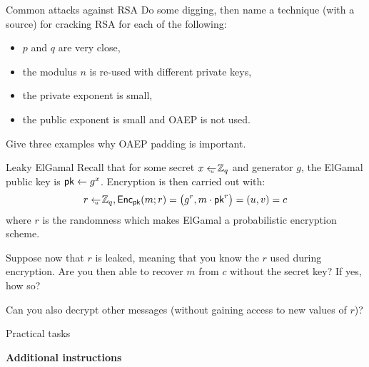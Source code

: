 \documentclass{homework}
\begin{document}
\begin{task}{Common attacks against RSA}
  Do some digging, then name a technique (with a source) for cracking RSA for each of the following:
  \begin{itemize}
    \item $p$ and $q$ are very close,
    \item the modulus $n$ is re-used with different private keys,
    \item the private exponent is small,
    \item the public exponent is small and OAEP is not used.
  \end{itemize}

  Give three examples why OAEP padding is important.
\end{task}

\begin{task}{Leaky ElGamal}
  Recall that for some secret $x\gets_{\scriptscriptstyle \hspace*{-0.65em} u\hspace*{0.0em}}\mathbb{Z}_q$ and generator $g$, the ElGamal public key is $\mathsf{pk}\gets g^x$.
  Encryption is then carried out with:
  \[
    r \gets_{\scriptscriptstyle \hspace*{-0.65em} u\hspace*{0.0em}} \mathbb{Z}_q, \mathsf{Enc}_{\mathsf{pk}}(m; r) = \bigl(g^r, m \cdot \mathsf{pk}^r\bigr) = (u, v) = c
  \]
  where $r$ is the randomness which makes ElGamal a probabilistic encryption scheme.

  Suppose now that $r$ is leaked, meaning that you know the $r$ used during encryption.
  Are you then able to recover $m$ from $c$ without the secret key?
  If yes, how so?

  Can you also decrypt other messages (without gaining access to new values of $r$)?
\end{task}

\newpage
\setcounter{task}{0}

\begin{center}
  Practical tasks
\end{center}

\textbf{Additional instructions}
\end{document}
